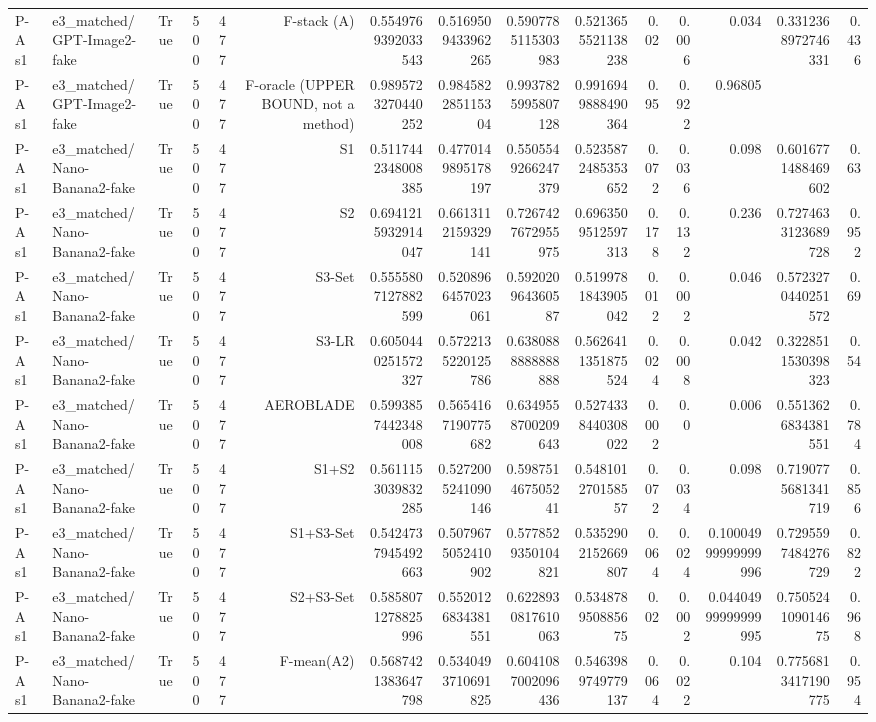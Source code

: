 \begin{table}[htbp]
\begin{tabular}{llrrrrrrrrrrrrr}
P-A s1 & e3\_matched/GPT-Image2-fake & True & 500 & 477 & F-stack (A) & 0.5549769392033543 & 0.5169509433962265 & 0.5907785115303983 & 0.5213655521138238 & 0.02 & 0.006 & 0.034 & 0.3312368972746331 & 0.436 \\
P-A s1 & e3\_matched/GPT-Image2-fake & True & 500 & 477 & F-oracle (UPPER BOUND, not a method) & 0.9895723270440252 & 0.984582285115304 & 0.9937825995807128 & 0.9916949888490364 & 0.95 & 0.922 & 0.96805 &  &  \\
P-A s1 & e3\_matched/Nano-Banana2-fake & True & 500 & 477 & S1 & 0.5117442348008385 & 0.4770149895178197 & 0.5505549266247379 & 0.5235872485353652 & 0.072 & 0.036 & 0.098 & 0.6016771488469602 & 0.63 \\
P-A s1 & e3\_matched/Nano-Banana2-fake & True & 500 & 477 & S2 & 0.6941215932914047 & 0.6613112159329141 & 0.7267427672955975 & 0.6963509512597313 & 0.178 & 0.132 & 0.236 & 0.7274633123689728 & 0.952 \\
P-A s1 & e3\_matched/Nano-Banana2-fake & True & 500 & 477 & S3-Set & 0.5555807127882599 & 0.5208966457023061 & 0.592020964360587 & 0.5199781843905042 & 0.012 & 0.002 & 0.046 & 0.5723270440251572 & 0.69 \\
P-A s1 & e3\_matched/Nano-Banana2-fake & True & 500 & 477 & S3-LR & 0.6050440251572327 & 0.5722135220125786 & 0.6380888888888888 & 0.5626411351875524 & 0.024 & 0.008 & 0.042 & 0.3228511530398323 & 0.54 \\
P-A s1 & e3\_matched/Nano-Banana2-fake & True & 500 & 477 & AEROBLADE & 0.5993857442348008 & 0.5654167190775682 & 0.6349558700209643 & 0.5274338440308022 & 0.002 & 0.0 & 0.006 & 0.5513626834381551 & 0.784 \\
P-A s1 & e3\_matched/Nano-Banana2-fake & True & 500 & 477 & S1+S2 & 0.5611153039832285 & 0.5272005241090146 & 0.598751467505241 & 0.548101270158557 & 0.072 & 0.034 & 0.098 & 0.7190775681341719 & 0.856 \\
P-A s1 & e3\_matched/Nano-Banana2-fake & True & 500 & 477 & S1+S3-Set & 0.5424737945492663 & 0.5079675052410902 & 0.5778529350104821 & 0.5352902152669807 & 0.064 & 0.024 & 0.10004999999999996 & 0.7295597484276729 & 0.822 \\
P-A s1 & e3\_matched/Nano-Banana2-fake & True & 500 & 477 & S2+S3-Set & 0.5858071278825996 & 0.5520126834381551 & 0.6228930817610063 & 0.534878950885675 & 0.02 & 0.002 & 0.04404999999999995 & 0.750524109014675 & 0.968 \\
P-A s1 & e3\_matched/Nano-Banana2-fake & True & 500 & 477 & F-mean(A2) & 0.5687421383647798 & 0.5340493710691825 & 0.6041087002096436 & 0.5463989749779137 & 0.064 & 0.022 & 0.104 & 0.7756813417190775 & 0.954 \\

\end{tabular}
\end{table}
